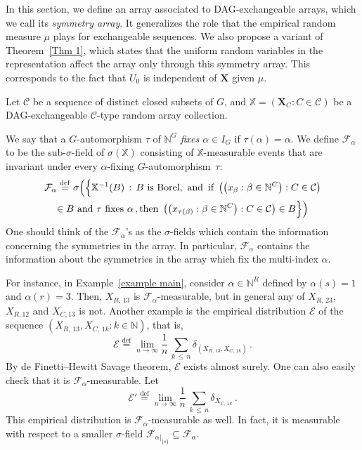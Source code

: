\documentclass[AHL,Unicode,longabstracts,published]{cedram}
\newcommand{\alf}{\alpha}%
\newcommand*\bb{\beta}
\newcommand*{\defeq}{\stackrel{\mathrm{def}}{=}}
\newcommand{\indices}[1]{\mathbb{N}^{#1}}
\newcommand*\X{\mathbb{X}}
\newcommand*\N{\mathbb{N}}
\newcommand*\CC{{\mathcal{C}}}
\newcommand*\EE{{\mathcal{E}}}
\newcommand*\FF{\mathcal{F}}
\newcommand*\bX{\mathbf{X}}
\newcommand*\N{\mathbb{N}}
\begin{document}
In this section, we define an array associated to DAG-exchangeable arrays, which we call its \emph{symmetry array}. It generalizes the role that the empirical random measure $\mu$ plays for exchangeable sequences. We also propose a variant of Theorem~\ref{Thm 1}, which states that the uniform random variables in the representation affect the array only through this symmetry array. This corresponds to the fact that $U_0$ is independent of $\bX$ given $\mu$.

Let $\CC$ be a sequence of distinct closed subsets of $G$, and $\X=(\bX_C : C \in \CC)$ be a DAG-exchangeable $\CC$-type random array collection.

We say that a $G$-automorphism $\tau$ of $\indices G$ \emph{fixes $\alf\in I_G$} if $\tau(\alf)=\alf$. We define $\mathcal{F}_\alf$ to be the sub-$\sigma$-field of $\sigma(\X)$ consisting of $\X$-measurable events that are invariant under every $\alf$-fixing $G$-automorphism~$\tau$:
\begin{multline}\label{def:F_alpha}
\mathcal{F}_\alf
\defeq \sigma\Big(\Big\{\X^{-1}(B)\,:\,B \text{ is Borel,\, and\, }
\text{if } \left(\left(x_\bb : \bb\in\indices C\right) : C \in \CC\right) \\
\in B \text{ and }\tau \text{ fixes }\alf\,,
\text{then } \left(\left(x_{\tau(\bb)} : \bb \in \indices C\right) : C \in \CC\right) \in B\Big\}\Big)
\end{multline}
One should think of the $\FF_\alf$'s as the $\sigma$-fields which contain the information concerning the symmetries in the array. In particular, $\FF_\alf$ contains the information about the symmetries in the array which fix the multi-index $\alf$.

For instance, in Example~\ref{example main}, consider $\alpha \in \N^R$ defined by $\alpha(s)=1$ and $\alpha(r)=3$. Then, $X_{R,\,13}$ is $\FF_\alpha$-measurable, but in general any of $X_{R,\,23}$, $X_{R,12}$ and $X_{C,13}$ is not. Another example is the empirical distribution $\EE$ of the sequence $(X_{R,\,13}, X_{C,\,1k} : k \in \N)$, that is,
\[
\EE
\defeq \lim_{n \to \infty} \frac{1}{n}\, \underset{k\, \leq\,n}{\sum} \delta_{(X_{R,\,13},X_{C,\,1k})}\,.
\]
By de Finetti--Hewitt Savage theorem, $\EE$ exists almost surely. One can also easily check that it is $\FF_\alf$-measurable. Let
\[
\EE'
\defeq \lim_{n \to \infty} \frac{1}{n}\, \underset{k \,\leq\,n}{\sum} \delta_{X_{C,\,1k}}\,.
\]
This empirical distribution is $\FF_\alf$-measurable as well. In fact, it is measurable with respect to a smaller $\sigma$-field $\FF_{\alf|_{\{s\}}} \subseteq \FF_\alf$.
\end{document}
